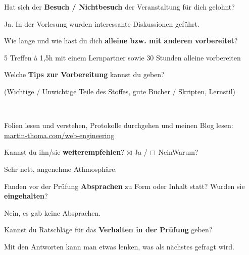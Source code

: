 \documentclass[a4paper]{article}
\begin{document}
 \begin{multicols}{2}

   Hat sich der \textbf{Besuch / Nichtbesuch} der Veranstaltung für dich gelohnt? \\
  \begin{minipage}[t][6.8cm]{\linewidth}
    Ja. In der Vorlesung wurden interessante Diskussionen geführt.

  \end{minipage}

   Wie lange und wie hast du dich \textbf{alleine bzw. mit anderen vorbereitet}? \\
  \begin{minipage}[t][7cm]{\linewidth}
    5 Treffen à 1,5h mit einem Lernpartner sowie 30 Stunden alleine vorbereiten

  \end{minipage}

   Welche \textbf{Tips zur Vorbereitung} kannst du geben?
  \begin{footnotesize}(Wichtige / Unwichtige Teile des Stoffes, gute Bücher / Skripten, Lernstil)\end{footnotesize} \\
  \begin{minipage}[t][7cm]{\linewidth}
    Folien lesen und verstehen, Protokolle durchgehen und
    meinen Blog lesen:\\
    \href{http://martin-thoma.com/web-engineering/}{martin-thoma.com/web-engineering}
  \end{minipage}

\columnbreak

   Kannst du ihn/sie \textbf{weiterempfehlen}?
  $\boxtimes$ Ja / $\boxempty$ Nein\newline Warum? \\
  \begin{minipage}[t][6.8cm]{\linewidth}
    Sehr nett, angenehme Athmosphäre.

  \end{minipage}

   Fanden vor der Prüfung \textbf{Absprachen} zu Form oder Inhalt statt? Wurden sie \textbf{eingehalten}? \\
  \begin{minipage}[t][7cm]{\linewidth}
    Nein, es gab keine Absprachen.

  \end{minipage}

   Kannst du Ratschläge für das \textbf{Verhalten in der Prüfung} geben? \\
  \begin{minipage}[t][6.8cm]{\linewidth}
    Mit den Antworten kann man etwas lenken, was als nächstes
    gefragt wird.

  \end{minipage}
%
\end{multicols}
\clearpage
\end{document}
